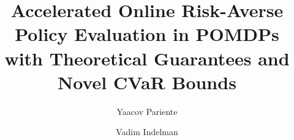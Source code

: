 \documentclass[acmlarge, manuscript, screen, review, natbib=false, oneside]{acmart}
\begin{document}
\raggedbottom

\title{Accelerated Online Risk-Averse Policy Evaluation in POMDPs with Theoretical Guarantees and Novel CVaR Bounds}

\author{Yaacov Pariente}

\author{Vadim Indelman}

\renewcommand{\shortauthors}{Pariente \& Indelman}
\end{document}
